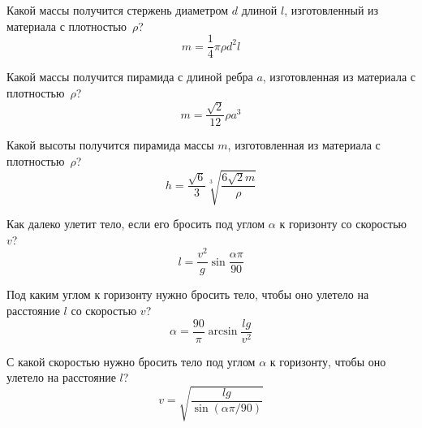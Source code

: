 
\begin{zztask}
Какой массы получится стержень диаметром $d$ длиной $l$, изготовленный из
материала с плотностью~$\rho$?
%
\[
m = \frac{1}{4}\pi\rho d^2 l
\]
\end{zztask}


\begin{zztask}
Какой массы получится пирамида с длиной ребра $a$, изготовленная из
материала с плотностью~$\rho$?
%
\[
m = \frac{\sqrt2}{12}\rho a^3
\]
\end{zztask}


\begin{zztask}
Какой высоты получится пирамида массы $m$, изготовленная из
материала с плотностью~$\rho$?
%
\[
h = \frac{\sqrt6}{3} \sqrt[3]{\frac{6\sqrt2 m}{\rho}}
\]
\end{zztask}


\begin{zztask}
Как далеко улетит тело, если его бросить под углом $\alpha$ к горизонту
со скоростью $v$?
%
\[
l = \frac{v^2}{g}\sin\frac{\alpha\pi}{90}
\]
\end{zztask}


\begin{zztask}
Под каким углом к горизонту нужно бросить тело, чтобы оно улетело на
расстояние $l$ со скоростью $v$?
%
\[
\alpha = \frac{90}{\pi}\arcsin\frac{lg}{v^2}
\]
\end{zztask}


\begin{zztask}
С какой скоростью нужно бросить тело под углом $\alpha$ к горизонту,
чтобы оно улетело на расстояние $l$?
%
\[
v = \sqrt{\frac{lg}{\sin(\alpha\pi/90)}}
\]
\end{zztask}


